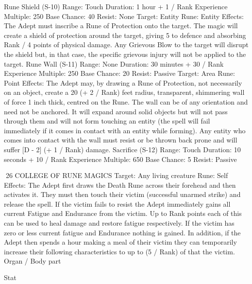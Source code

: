 \documentclass[a4paper]{article}
\begin{document}
\begin{multicols}{3}
Rune Shield (S-10)
Range: Touch
Duration: 1 hour + 1 / Rank
Experience Multiple: 250
Base Chance: 40%
Resist: None
Target: Entity
Rune: Entity
Effects: The Adept must inscribe a Rune of Protection onto the target. The magic will create a shield
of protection around the target, giving 5%
to defence and absorbing Rank / 4 points of physical damage. Any Grievous Blow to the target will
disrupt the shield but, in that case, the specific
grievous injury will not be applied to the target.
Rune Wall (S-11)
Range: None
Duration: 30 minutes + 30 / Rank
Experience Multiple: 250
Base Chance: 20%
Resist: Passive
Target: Area
Rune: Point
Effects: The Adept may, by drawing a Rune of
Protection, not necessarily on an object, create a 20
(+ 2 / Rank) feet radius, transparent, shimmering
wall of force 1 inch thick, centred on the Rune.
The wall can be of any orientation and need not be
anchored. It will expand around solid objects but
will not pass through them and will not form
touching an entity (the spell will fail immediately if
it comes in contact with an entity while forming).
Any entity who comes into contact with the wall
must resist or be thrown back prone and will suffer
[D - 2] (+ 1 / Rank) damage.
Sacrifice (S-12)
Range: Touch
Duration: 10 seconds + 10 / Rank
Experience Multiple: 650
Base Chance: 5%
Resist: Passive

26 COLLEGE OF RUNE MAGICS
Target: Any living creature
Rune: Self
Effects: The Adept first draws the Death Rune
across their forehead and then activates it. They
must then touch their victim (successful unarmed
strike) and release the spell. If the victim fails to
resist the Adept immediately gains all current
Fatigue and Endurance from the victim. Up to
Rank points each of this can be used to heal damage and restore fatigue respectively. If the victim
has zero or less current fatigue and Endurance
nothing is gained.
In addition, if the Adept then spends a hour making
a meal of their victim they can temporarily increase
their following characteristics to up to (5 / Rank) %
of that the victim.
Organ / Body part

Stat


\end{multicols}
\end{document}

